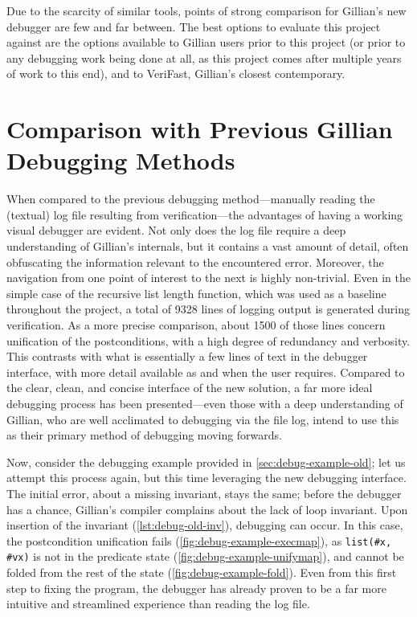 Due to the scarcity of similar tools, points of strong comparison for Gillian's
new debugger are few and far between. The best options to evaluate this project
against are the options available to Gillian users prior to this project (or
prior to any debugging work being done at all, as this project comes after
multiple years of work to this end), and to VeriFast, Gillian's closest
contemporary.

\section{Comparison with Previous Gillian Debugging Methods}

When compared to the previous debugging method---manually reading the (textual)
log file resulting from verification---the advantages of having a working visual
debugger are evident. Not only does the log file require a deep understanding of
Gillian's internals, but it contains a vast amount of detail, often obfuscating
the information relevant to the encountered error. Moreover, the navigation from
one point of interest to the next is highly non-trivial. Even in the simple case
of the recursive list length function, which was used as a baseline throughout
the project, a total of 9328 lines of logging output is generated during
verification. As a more precise comparison, about 1500 of those lines concern
unification of the postconditions, with a high degree of redundancy and
verbosity. This contrasts with what is essentially a few lines of text in the
debugger interface, with more detail available as and when the user requires.
Compared to the clear, clean, and concise interface of the new solution, a far
more ideal debugging process has been presented---even those with a deep
understanding of Gillian, who are well acclimated to debugging via the file log,
intend to use this as their primary method of debugging moving forwards.

Now, consider the debugging example provided in \autoref{sec:debug-example-old};
let us attempt this process again, but this time leveraging the new debugging
interface. The initial error, about a missing invariant, stays the same; before
the debugger has a chance, Gillian's compiler complains about the lack of loop
invariant. Upon insertion of the invariant (\autoref{lst:debug-old-inv}),
debugging can occur. In this case, the postcondition unification fails
(\autoref{fig:debug-example-execmap}), as \texttt{list(\#x, \#vx)} is not in the
predicate state (\autoref{fig:debug-example-unifymap}), and cannot be folded
from the rest of the state (\autoref{fig:debug-example-fold}). Even from this
first step to fixing the program, the debugger has already proven to be a far
more intuitive and streamlined experience than reading the log file.

